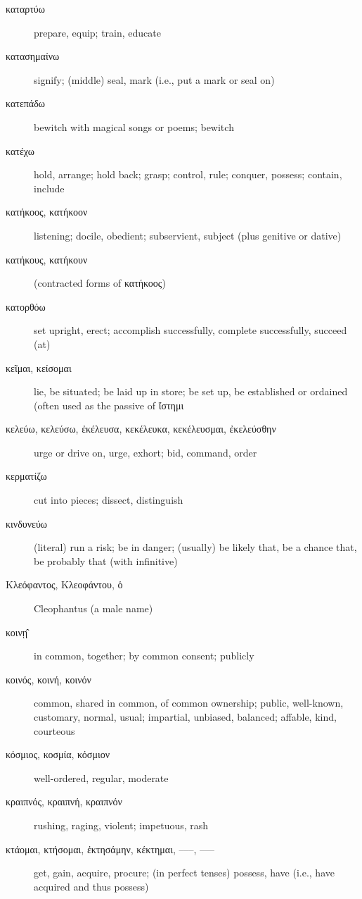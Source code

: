 \documentclass[12pt,letterpaper]{article}
\begin{document}
\begin{description}
    \item[\textgreek{καταρτύω}] prepare, equip; train, educate
    \item[\textgreek{κατασημαίνω}] signify; (middle) seal, mark (i.e., put a mark or seal on)
    \item[\textgreek{κατεπάδω}] bewitch with magical songs or poems; bewitch
    \item[\textgreek{κατέχω}] hold, arrange; hold back; grasp; control, rule; conquer, possess; contain, include
    \item[\textgreek{κατήκοος, κατήκοον}] listening; docile, obedient; subservient, subject (plus genitive or dative)
    \item[\textgreek{κατήκους, κατήκουν}] (contracted forms of \textgreek{κατήκοος})
    \item[\textgreek{κατορθόω}] set upright, erect; accomplish successfully, complete successfully, succeed (at)
    \item[\textgreek{κεῖμαι, κείσομαι}] \marginnote{*}lie, be situated; be laid up in store; be set up, be established or ordained (often used as the passive of \textgreek{ἵστημι}
    \item[\textgreek{κελεύω, κελεύσω, ἐκέλευσα, κεκέλευκα, κεκέλευσμαι, ἐκελεύσθην}] \marginnote{*}urge or drive on, urge, exhort; bid, command, order
    \item[\textgreek{κερματίζω}] cut into pieces; dissect, distinguish
    \item[\textgreek{κινδυνεύω}] (literal) run a risk; be in danger; (usually) be likely that, be a chance that, be probably that (with infinitive)
    \item[\textgreek{Κλεόφαντος, Κλεοφάντου, ὁ}] Cleophantus (a male name)
    \item[\textgreek{κοινῃ̂}] in common, together; by common consent; publicly
    \item[\textgreek{κοινός, κοινή, κοινόν}] \marginnote{*}common, shared in common, of common ownership; public, well-known, customary, normal, usual; impartial, unbiased, balanced; affable, kind, courteous
    \item[\textgreek{κόσμιος, κοσμία, κόσμιον}] well-ordered, regular, moderate
    \item[\textgreek{κραιπνός, κραιπνή, κραιπνόν}] rushing, raging, violent; impetuous, rash
    \item[\textgreek{κτάομαι, κτήσομαι, ἐκτησάμην, κέκτημαι, –––, –––}] \marginnote{*}get, gain, acquire, procure; (in perfect tenses) possess, have (i.e., have acquired and thus possess)

\end{description}
\end{document}

